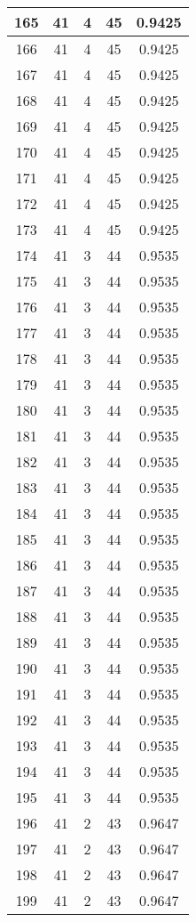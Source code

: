 \documentclass[letterpaper, 12pt]{article}
\begin{document}
\begin{longtable}{|c|c|c|c|c|}
\hline
165 & 41 & 4 & 45 & 0.9425 \\
\hline
166 & 41 & 4 & 45 & 0.9425 \\
\hline
167 & 41 & 4 & 45 & 0.9425 \\
\hline
168 & 41 & 4 & 45 & 0.9425 \\
\hline
169 & 41 & 4 & 45 & 0.9425 \\
\hline
170 & 41 & 4 & 45 & 0.9425 \\
\hline
171 & 41 & 4 & 45 & 0.9425 \\
\hline
172 & 41 & 4 & 45 & 0.9425 \\
\hline
173 & 41 & 4 & 45 & 0.9425 \\
\hline
174 & 41 & 3 & 44 & 0.9535 \\
\hline
175 & 41 & 3 & 44 & 0.9535 \\
\hline
176 & 41 & 3 & 44 & 0.9535 \\
\hline
177 & 41 & 3 & 44 & 0.9535 \\
\hline
178 & 41 & 3 & 44 & 0.9535 \\
\hline
179 & 41 & 3 & 44 & 0.9535 \\
\hline
180 & 41 & 3 & 44 & 0.9535 \\
\hline
181 & 41 & 3 & 44 & 0.9535 \\
\hline
182 & 41 & 3 & 44 & 0.9535 \\
\hline
183 & 41 & 3 & 44 & 0.9535 \\
\hline
184 & 41 & 3 & 44 & 0.9535 \\
\hline
185 & 41 & 3 & 44 & 0.9535 \\
\hline
186 & 41 & 3 & 44 & 0.9535 \\
\hline
187 & 41 & 3 & 44 & 0.9535 \\
\hline
188 & 41 & 3 & 44 & 0.9535 \\
\hline
189 & 41 & 3 & 44 & 0.9535 \\
\hline
190 & 41 & 3 & 44 & 0.9535 \\
\hline
191 & 41 & 3 & 44 & 0.9535 \\
\hline
192 & 41 & 3 & 44 & 0.9535 \\
\hline
193 & 41 & 3 & 44 & 0.9535 \\
\hline
194 & 41 & 3 & 44 & 0.9535 \\
\hline
195 & 41 & 3 & 44 & 0.9535 \\
\hline
196 & 41 & 2 & 43 & 0.9647 \\
\hline
197 & 41 & 2 & 43 & 0.9647 \\
\hline
198 & 41 & 2 & 43 & 0.9647 \\
\hline
199 & 41 & 2 & 43 & 0.9647 \\
\hline
\end{longtable}
\end{document}
